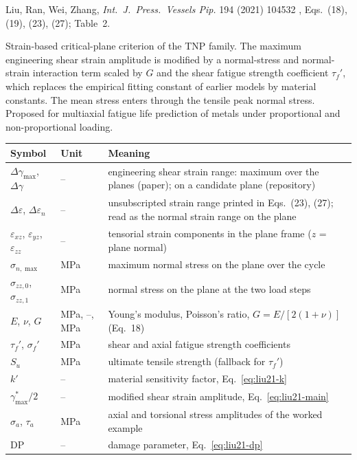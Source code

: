 \label{sheet:LIU2021}

 Liu, Ran, Wei, Zhang, \emph{Int.\ J.\ Press.\ Vessels Pip.} 194 (2021) 104532
\cite{liu2021}, Eqs.~(18), (19), (23), (27); Table~2.

 Strain-based critical-plane criterion of the TNP family. The maximum
engineering shear strain amplitude is modified by a normal-stress and normal-strain interaction
term scaled by $G$ and the shear fatigue strength coefficient $\tau_f'$, which replaces the
empirical fitting constant of earlier models by material constants. The mean stress enters through
the tensile peak normal stress. Proposed for multiaxial fatigue life prediction of metals under
proportional and non-proportional loading.

\begin{center}\small
\begin{tabular}{@{}llp{100mm}@{}}
\toprule
Symbol & Unit & Meaning\\\midrule
$\Delta\gamma_{\max}$, $\Delta\gamma$ & -- & engineering shear strain range: maximum over the planes (paper); on a candidate plane (repository)\\
$\Delta\varepsilon$, $\Delta\varepsilon_n$ & -- & unsubscripted strain range printed in Eqs.~(23), (27); read as the normal strain range on the plane\\
$\varepsilon_{xz}$, $\varepsilon_{yz}$, $\varepsilon_{zz}$ & -- & tensorial strain components in the plane frame ($z$ = plane normal)\\
$\sigma_{n,\max}$ & MPa & maximum normal stress on the plane over the cycle\\
$\sigma_{zz,0}$, $\sigma_{zz,1}$ & MPa & normal stress on the plane at the two load steps\\
$E$, $\nu$, $G$ & MPa, --, MPa & Young's modulus, Poisson's ratio, $G=E/[2(1+\nu)]$ (Eq.~18)\\
$\tau_f'$, $\sigma_f'$ & MPa & shear and axial fatigue strength coefficients\\
$S_u$ & MPa & ultimate tensile strength (fallback for $\tau_f'$)\\
$k'$ & -- & material sensitivity factor, Eq.~\eqref{eq:liu21-k}\\
$\gamma^*_{\max}/2$ & -- & modified shear strain amplitude, Eq.~\eqref{eq:liu21-main}\\
$\sigma_a$, $\tau_a$ & MPa & axial and torsional stress amplitudes of the worked example\\
$\mathrm{DP}$ & -- & damage parameter, Eq.~\eqref{eq:liu21-dp}\\
\bottomrule
\end{tabular}
\end{center}

